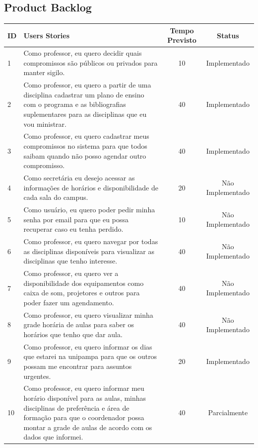 \documentclass{abnt}
\begin{document}
	
\begin{landscape}
	\chapter{Product Backlog}
		\begin{longtable}{|p{0.5in}|p{6in}|c|c|}
		\hline
		  {\bf ID} & {\bf Users Stories} & {\bf Tempo Previsto} & {\bf Status} \\
		\hline
		         1 & Como professor, eu quero decidir quais compromissos são públicos ou privados para manter sigilo. &         10 & Implementado \\
		\hline
		         2 & Como professor, eu quero a partir de uma disciplina cadastrar um plano de ensino com o programa e as bibliografias suplementares para as disciplinas que eu vou ministrar. &         40 & Implementado \\
		\hline
		         3 & Como professor, eu quero cadastrar meus compromissos no sistema para que todos saibam quando não posso agendar outro compromisso. &         40 & Implementado \\
		\hline
		         4 & Como secretária eu desejo acessar as informações de horários e disponibilidade de cada sala do campus.  &         20 & Não Implementado \\
		\hline
		         5 & Como usuário, eu quero poder pedir minha senha por email para que eu possa recuperar caso eu tenha perdido. &         10 & Não Implementado \\
		\hline
		         6 & Como professor, eu quero navegar por todas as disciplinas disponíveis para visualizar as disciplinas que tenho interesse.  &         40 & Não Implementado \\
		\hline
		         7 & Como professor, eu quero ver a disponibilidade dos equipamentos como caixa de som, projetores e outros para poder fazer um agendamento. &         40 & Não Implementado \\
		\hline
		         8 & Como professor, eu quero visualizar minha grade horária de aulas para saber os horários que tenho que dar aula. &         40 & Não Implementado \\
		\hline
		         9 & Como professor, eu quero informar os dias que estarei na unipampa para que os outros possam me encontrar para assuntos urgentes.  &         20 & Implementado \\
		\hline
		        10 & Como professor, eu quero informar meu horário disponível para as aulas, minhas disciplinas de preferência e área de formação para que o coordenador possa montar a grade de aulas de acordo com os dados que informei. &         40 & Parcialmente \\
		\hline
	

\end{longtable}
\end{landscape}
\end{document}
